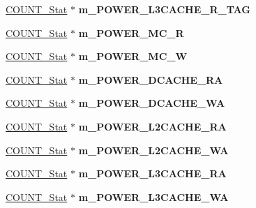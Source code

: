 \begin{DoxyCompactItemize}
\item 
\hypertarget{classall__stats__c_a4853465a89031b1d5fce8a17fc09e861}{
\hyperlink{classCOUNT__Stat}{COUNT\_\-Stat} $\ast$ {\bfseries m\_\-POWER\_\-L3CACHE\_\-R\_\-TAG}}
\label{classall__stats__c_a4853465a89031b1d5fce8a17fc09e861}

\item 
\hypertarget{classall__stats__c_a1650c904dc314893b0b0693f8557ca1a}{
\hyperlink{classCOUNT__Stat}{COUNT\_\-Stat} $\ast$ {\bfseries m\_\-POWER\_\-MC\_\-R}}
\label{classall__stats__c_a1650c904dc314893b0b0693f8557ca1a}

\item 
\hypertarget{classall__stats__c_a8fcacca3404e106498a420d44a151611}{
\hyperlink{classCOUNT__Stat}{COUNT\_\-Stat} $\ast$ {\bfseries m\_\-POWER\_\-MC\_\-W}}
\label{classall__stats__c_a8fcacca3404e106498a420d44a151611}

\item 
\hypertarget{classall__stats__c_a7b06ecdf99100bfe0e58a100517dadfc}{
\hyperlink{classCOUNT__Stat}{COUNT\_\-Stat} $\ast$ {\bfseries m\_\-POWER\_\-DCACHE\_\-RA}}
\label{classall__stats__c_a7b06ecdf99100bfe0e58a100517dadfc}

\item 
\hypertarget{classall__stats__c_a2c01afe703f347ba13374e3012942138}{
\hyperlink{classCOUNT__Stat}{COUNT\_\-Stat} $\ast$ {\bfseries m\_\-POWER\_\-DCACHE\_\-WA}}
\label{classall__stats__c_a2c01afe703f347ba13374e3012942138}

\item 
\hypertarget{classall__stats__c_a9894dc551d93a9a789c6e953083f8f17}{
\hyperlink{classCOUNT__Stat}{COUNT\_\-Stat} $\ast$ {\bfseries m\_\-POWER\_\-L2CACHE\_\-RA}}
\label{classall__stats__c_a9894dc551d93a9a789c6e953083f8f17}

\item 
\hypertarget{classall__stats__c_a03d94071bbdef417f2fbfc085846e8cb}{
\hyperlink{classCOUNT__Stat}{COUNT\_\-Stat} $\ast$ {\bfseries m\_\-POWER\_\-L2CACHE\_\-WA}}
\label{classall__stats__c_a03d94071bbdef417f2fbfc085846e8cb}

\item 
\hypertarget{classall__stats__c_a0919266158f97ecaae36aa787e4f024a}{
\hyperlink{classCOUNT__Stat}{COUNT\_\-Stat} $\ast$ {\bfseries m\_\-POWER\_\-L3CACHE\_\-RA}}
\label{classall__stats__c_a0919266158f97ecaae36aa787e4f024a}

\item 
\hypertarget{classall__stats__c_a17c877f0e40b985dea92837337900fce}{
\hyperlink{classCOUNT__Stat}{COUNT\_\-Stat} $\ast$ {\bfseries m\_\-POWER\_\-L3CACHE\_\-WA}}
\label{classall__stats__c_a17c877f0e40b985dea92837337900fce}


\end{DoxyCompactItemize}
